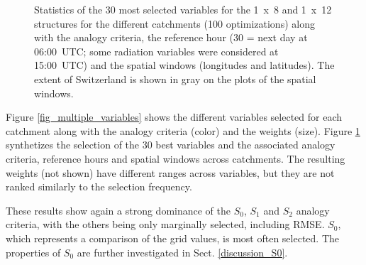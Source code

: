 \documentclass[draft]{agujournal2019}
\begin{document}
\begin{figure}[H]
	\noindent{}
	\caption{Statistics of the 30 most selected variables for the 1~x~8 and 1~x~12 structures for the different catchments (100 optimizations) along with the analogy criteria, the reference hour (30 = next day at 06:00~UTC; some radiation variables were considered at 15:00~UTC) and the spatial windows (longitudes and latitudes). The extent of Switzerland is shown in gray on the plots of the spatial windows.}
	\label{fig_stats_params}
\end{figure}


Figure \ref{fig_multiple_variables} shows the different variables selected for each catchment along with the analogy criteria (color) and the weights (size). Figure \ref{fig_stats_params} synthetizes the selection of the 30 best variables and the associated analogy criteria, reference hours and spatial windows across catchments. The resulting weights (not shown) have different ranges across variables, but they are not ranked similarly to the selection frequency.

These results show again a strong dominance of the $S_{0}$, $S_{1}$ and $S_{2}$ analogy criteria, with the others being only marginally selected, including RMSE. $S_{0}$, which represents a comparison of the grid values, is most often selected. The properties of $S_{0}$ are further investigated in Sect. \ref{discussion_S0}.  
\end{document}
